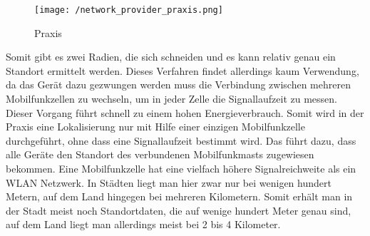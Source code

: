 \begin{wrapfigure}{r}{45mm}
\centering
   \texttt{[image: /network\_provider\_praxis.png]} 
   \vspace{-5mm}
   \caption[Lokalisierung: NETWORK Provider in der Praxis]{Praxis}
   \vspace{-5mm}
\end{wrapfigure}
Somit gibt es zwei Radien, die sich schneiden und es kann relativ genau ein Standort ermittelt werden. 
Dieses Verfahren findet allerdings kaum Verwendung, da das Gerät dazu gezwungen werden muss die Verbindung zwischen  mehreren Mobilfunkzellen zu wechseln, um in jeder Zelle die Signallaufzeit zu messen. Dieser Vorgang führt schnell zu einem hohen Energieverbrauch. Somit wird in der Praxis eine Lokalisierung nur mit Hilfe einer einzigen Mobilfunkzelle durchgeführt, ohne dass eine Signallaufzeit bestimmt wird. Das führt dazu, dass alle Geräte den Standort des verbundenen Mobilfunkmasts zugewiesen bekommen. 
Eine Mobilfunkzelle hat eine vielfach höhere Signalreichweite als ein WLAN Netzwerk. In Städten liegt man hier zwar nur bei wenigen hundert Metern, auf dem Land hingegen bei mehreren Kilometern. Somit erhält man in der Stadt meist noch Standortdaten, die auf wenige hundert Meter genau sind, auf dem Land liegt man allerdings meist bei 2 bis 4 Kilometer.

